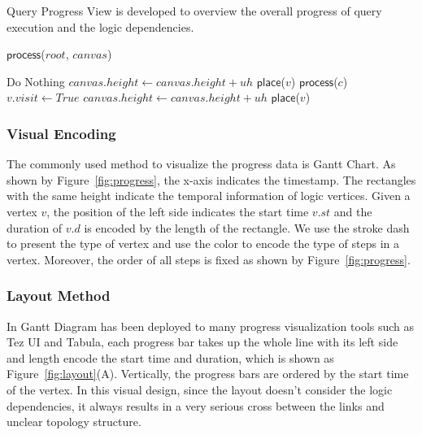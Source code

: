 Query Progress View is developed to overview the overall progress of query execution and the logic dependencies. 

\begin{algorithm}
	\caption{$\mathsf{TDAGLayout}$($R$, $canvas$)}
	\label{alg:TDAGLayout}
	\begin{algorithmic}[1]
		\State$\mathsf{process}$($root$, $canvas$)
		\EndFor
	\end{algorithmic}

\end{algorithm}

\begin{algorithm}
	\caption{$\mathsf{process}$($v$, $canvas$)}
	\label{alg:process}
	\begin{algorithmic}[1]
			\State Do Nothing
		\EndIf
				\State $canvas.height \leftarrow canvas.height + uh$
				\State $\mathsf{place}$($v$)
			\EndIf
		\Else
				\State $\mathsf{process}$($c$)
					\State $v.visit \leftarrow True$
				\EndIf
			\EndFor
				\State $canvas.height \leftarrow canvas.height + uh$
				\State $\mathsf{place}$($v$)
			\EndIf
		\EndIf
	\end{algorithmic}
\end{algorithm}




\subsubsection{Visual Encoding}
The commonly used method to visualize the progress data is Gantt Chart.
As shown by Figure~\ref{fig:progress}, the x-axis indicates the timestamp. The rectangles with the same height indicate the temporal information of logic vertices. 
Given a vertex $v$, the position of the left side indicates the start time $v.st$ and the duration of $v.d$ is encoded by the length of the rectangle. We use the stroke dash to present the type of vertex and use the color to encode the type of steps in a vertex. Moreover, the order of all steps is fixed as shown by Figure~\ref{fig:progress}.

\subsubsection{Layout Method}
In Gantt Diagram has been deployed to many progress visualization tools such as Tez UI and Tabula, each progress bar takes up the whole line with its left side and length encode the start time and duration, which is shown as Figure~\ref{fig:layout}(A).
Vertically, the progress bars are ordered by the start time of the vertex. In this visual design, since the layout doesn't consider the logic dependencies, it always results in a very serious cross between the links and unclear topology structure.

